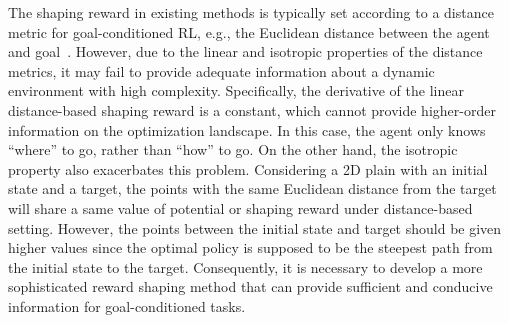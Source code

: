 \documentclass[journal]{IEEEtran}
\begin{document}
The shaping reward in existing methods is typically set according to a distance metric for goal-conditioned RL, e.g., the Euclidean distance between the agent and goal~\citep{trott2019keeping}.
However, due to the linear and isotropic properties of the distance metrics, it may fail to provide adequate information about a dynamic environment with high complexity. 
Specifically, the derivative of the linear distance-based shaping reward is a constant, which cannot provide higher-order information on the optimization landscape.
In this case, the agent only knows ``where'' to go, rather than ``how'' to go.
On the other hand, the isotropic property also exacerbates this problem. 
Considering a 2D plain with an initial state and a target, the points with the same Euclidean distance from the target will share a same value of potential or shaping reward under distance-based setting.
However, the points between the initial state and target should be given higher values since the optimal policy is supposed to be the steepest path from the initial state to the target.
Consequently, it is necessary to develop a more sophisticated reward shaping method that can provide sufficient and conducive information for goal-conditioned tasks.
\end{document}
